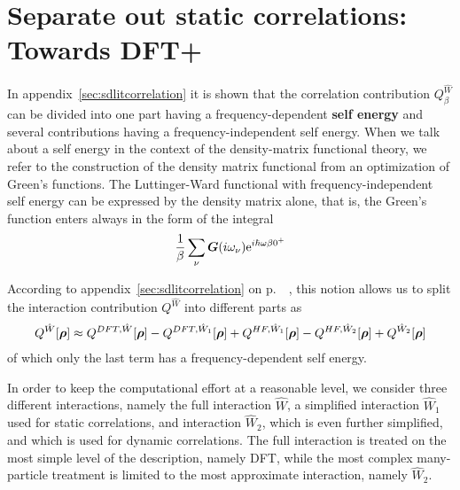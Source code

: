 \documentclass[11pt,a4paper]{report}
\begin{document}
\section{Separate out static correlations: Towards DFT+}
In appendix~\ref{sec:sdlitcorrelation} it is shown that the
correlation contribution $Q^{\hat{W}}_\beta$ can be divided into one
part having a frequency-dependent \textbf{self
  energy} and several contributions having a
frequency-independent self energy. When we talk about a self energy in
the context of the density-matrix functional theory, we refer to the
construction of the density matrix functional from an optimization of
Green's functions.\cite{bloechl13_prb88_25139} The Luttinger-Ward
functional with frequency-independent self energy can be expressed by
the density matrix alone, that is, the Green's function enters always
in the form of the integral
\begin{eqnarray}
\frac{1}{\beta}\sum_\nu\bm{G}(i\omega_\nu)\mathrm{e}^{i\hbar\omega\beta0^+}
\end{eqnarray}

According to appendix~\ref{sec:sdlitcorrelation} on
p.~~\pageref{sec:sdlitcorrelation}, this notion allows us to split the
interaction contribution $Q^{\hat{W}}$ into different parts as
\begin{eqnarray}
Q^{\hat{W}}[\bm{\rho}]
\approx Q^{DFT,\hat{W}}[\bm{\rho}]-Q^{DFT,\hat{W}_1}[\bm{\rho}]
+Q^{HF,\hat{W}_1}[\bm{\rho}]-Q^{HF,\hat{W}_2}[\bm{\rho}]
+Q^{\hat{W}_2}[\bm{\rho}]
\label{eq:splitq}
\end{eqnarray}
of which only the last term has a frequency-dependent self energy.

In order to keep the computational effort at a reasonable level, we
consider three different interactions, namely the full interaction
$\hat{W}$, a simplified interaction $\hat{W}_1$ used for static
correlations, and interaction $\hat{W}_2$, which is even further
simplified, and which is used for dynamic correlations.
The full interaction is treated on the most simple level of the
description, namely DFT, while the most complex many-particle
treatment is limited to the most approximate interaction, namely
$\hat{W}_2$. 
\end{document}
